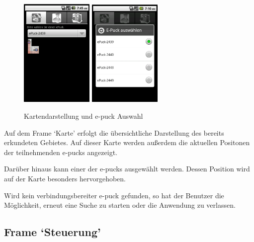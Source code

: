 \documentclass[10pt,a4paper]{article}
\begin{document}
			\begin{figure}[h]
				  \centering
				\includegraphics[width=3.5cm]{screenshots/android1b.png}
				\includegraphics[width=3.5cm]{screenshots/android1a.png}
  				\caption{Kartendarstellung und e-puck Auswahl}
  			\end{figure}						
			
			Auf dem Frame `Karte' erfolgt die übersichtliche Darstellung des bereits erkundeten Gebietes. Auf dieser Karte werden außerdem
			die aktuellen Positonen der teilnehmenden e-pucks angezeigt.
			
			Darüber hinaus kann einer der e-pucks ausgewählt werden. Dessen Position wird auf der Karte besonders hervorgehoben.
			
			Wird kein verbindungsbereiter e-puck gefunden, so hat der Benutzer die Möglichkeit, erneut eine Suche zu starten oder die Anwendung
			zu verlassen.
			\subsection{Frame `Steuerung'}
			
\end{document}
